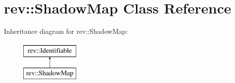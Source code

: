 \hypertarget{classrev_1_1_shadow_map}{}\section{rev\+::Shadow\+Map Class Reference}
\label{classrev_1_1_shadow_map}
Inheritance diagram for rev\+::Shadow\+Map\+:\begin{figure}[H]
\begin{center}
\leavevmode
\includegraphics[height=2.000000cm]{classrev_1_1_shadow_map}
\end{center}
\end{figure}
